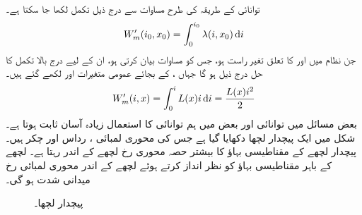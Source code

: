 توانائی کے طریقہ  کی طرح مساوات  سے درج ذیل تکمل لکھا جا سکتا ہے۔
\begin{align}
W_m'(i_0,x_0)=\int_{0}^{i_0} \lambda(i,x_0) \dif i
\end{align}
جن نظام میں  اور  کا تعلق تغیر راست ہو، جس کو مساوات  بیان کرتی ہو، ان کے لیے درج بالا تکمل کا حل درج ذیل ہو گا  جہاں ،  کے بجائے عمومی متغیرات  اور  لکھے گئے ہیں۔
\begin{align}\label{مساوات_تبادلہ_کوتوانائی_مساوی_امالہ_مربع_رو}
W_m'(i,x)=\int_{0}^{i} L(x) i  \dif i=\frac{L(x) i^2}{2}
\end{align}
بعض مسائل میں توانائی اور  بعض میں ہم توانائی کا استعمال زیادہ آسان ثابت ہوتا ہے۔
%
شکل   میں ایک پیچدار لچھا دکھایا گیا ہے جس کی محوری لمبائی ،   رداس   اور چکر   ہیں۔پیچدار لچھے کے مقناطیسی بہاؤ کا بیشتر حصہ محوری رخ  لچھے کے اندر رہتا ہے۔ لچھے کے باہر مقناطیسی بہاؤ کو نظر انداز کرتے ہوئے  لچھے کے اندر محوری لمبائی رخ میدانی شدت  ہو گی۔
\begin{figure}
\centering
%
\caption{پیچدار لچھا۔}
\label{شکل_تبادلہ_توانائی_پیچدار_لچھا}
\end{figure}

